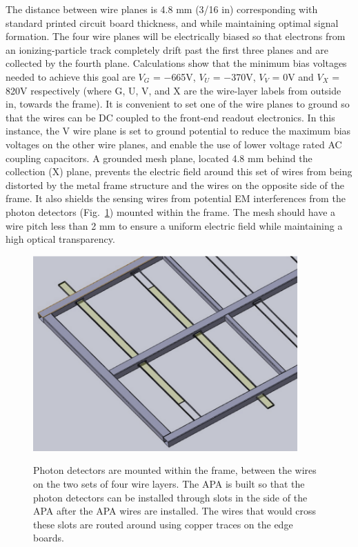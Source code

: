 The distance between wire planes is 4.8 mm (3/16 in) corresponding with standard printed circuit board thickness, and while maintaining optimal signal formation. The four wire planes will be electrically biased so that electrons from an ionizing-particle track completely drift past the first three planes and are collected by the fourth plane. Calculations show that the minimum bias voltages needed to achieve this goal are $V_G$ = $−$665V, $V_U$ = $−$370V, $V_V$ = 0V and $V_X$ = 820V respectively (where G, U, V, and X are the wire-layer labels from outside in, towards the frame).  It is convenient to set one of the wire planes to ground so that the wires can be DC coupled to the front-end readout electronics. In this instance, the V wire plane is set to ground potential to reduce the maximum bias voltages on the other wire planes, and enable the use of lower voltage rated AC coupling capacitors. A grounded mesh plane, located 4.8 mm behind the collection (X) plane, prevents the electric field around this set of wires from being distorted by the metal frame structure and the wires on the opposite side of the frame. It also shields the sensing wires from potential EM interferences from the photon detectors (Fig.~\ref{fig:tpc_apa_pd_insertion}) mounted within the frame. The mesh should have a wire pitch less than 2 mm to ensure a uniform electric field while maintaining a high optical transparency.

\begin{figure}[t]
  \centering
\includegraphics[width=4in]{figures/TPC_APA_3}
\label{fig:tpc_apa_pd_insertion}
  \caption{Photon detectors are mounted within the frame, between the wires on the two sets of four wire layers.  The APA is built so that the photon detectors can be installed through slots in the side of the APA after the APA wires are installed.  The wires that would cross these slots are routed around using copper traces on the edge boards.}
\end{figure}


